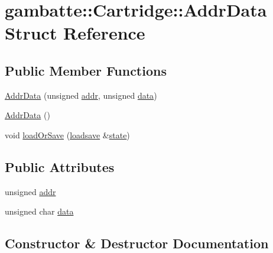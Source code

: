 \hypertarget{structgambatte_1_1Cartridge_1_1AddrData}{}\section{gambatte\+:\+:Cartridge\+:\+:Addr\+Data Struct Reference}
\label{structgambatte_1_1Cartridge_1_1AddrData}
\subsection*{Public Member Functions}
\begin{DoxyCompactItemize}
\item 
\hyperlink{structgambatte_1_1Cartridge_1_1AddrData_aa1067bb712c1ff5ad2ef909269913b7c}{Addr\+Data} (unsigned \hyperlink{structgambatte_1_1Cartridge_1_1AddrData_a319167bb5ea6c0005b0450b4456fd758}{addr}, unsigned \hyperlink{structgambatte_1_1Cartridge_1_1AddrData_aef69898503c544399fe27e93dee85c6d}{data})
\item 
\hyperlink{structgambatte_1_1Cartridge_1_1AddrData_aaf708239338bf5dc3d282cccb473be08}{Addr\+Data} ()
\item 
void \hyperlink{structgambatte_1_1Cartridge_1_1AddrData_abfd84676db7b3869cf234e1f60843f84}{load\+Or\+Save} (\hyperlink{classgambatte_1_1loadsave}{loadsave} \&\hyperlink{ppu_8cpp_a2f2eca6997ee7baf8901725ae074d45b}{state})
\end{DoxyCompactItemize}
\subsection*{Public Attributes}
\begin{DoxyCompactItemize}
\item 
unsigned \hyperlink{structgambatte_1_1Cartridge_1_1AddrData_a319167bb5ea6c0005b0450b4456fd758}{addr}
\item 
unsigned char \hyperlink{structgambatte_1_1Cartridge_1_1AddrData_aef69898503c544399fe27e93dee85c6d}{data}
\end{DoxyCompactItemize}


\subsection{Constructor \& Destructor Documentation}
\mbox{\label{structgambatte_1_1Cartridge_1_1AddrData_aa1067bb712c1ff5ad2ef909269913b7c}} 
